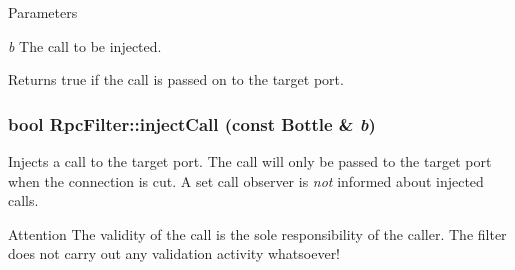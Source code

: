 \begin{DoxyParams}{Parameters}
\item[{\em b}]The call to be injected. \end{DoxyParams}
\begin{DoxyReturn}{Returns}
{\ttfamily true} if the call is passed on to the target port. 
\end{DoxyReturn}
\hypertarget{classyarp_1_1os_1_1_rpc_filter_a18789775d8040efabf1bc8df5d0f1c86}{
\subsubsection[{injectCall}]{\setlength{\rightskip}{0pt plus 5cm}bool RpcFilter::injectCall (const Bottle \& {\em b})}}
\label{classyarp_1_1os_1_1_rpc_filter_a18789775d8040efabf1bc8df5d0f1c86}
Injects a call to the target port. The call will only be passed to the target port when the connection is cut. A set call observer is {\itshape not\/} informed about injected calls.

\begin{DoxyAttention}{Attention}
The validity of the call is the sole responsibility of the caller. The filter does not carry out any validation activity whatsoever! 
\end{DoxyAttention}

